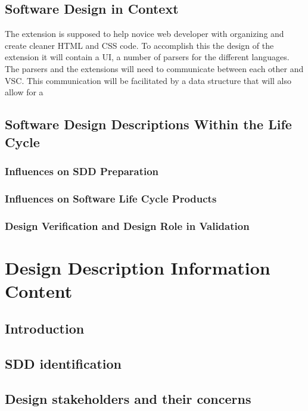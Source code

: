 \documentclass[letterpaper,10pt,titlepage,draftclsnofoot,onecolumn,onesided] {IEEEtran}
\begin{document}
\subsection{Software Design in Context}
The extension is supposed to help novice web developer with organizing and create cleaner HTML and CSS code. 
To accomplish this the design of the extension it will contain a UI, a number of parsers for the different languages.
The parsers and the extensions will need to communicate between each other and VSC.
This communication will be facilitated by a data structure that will also allow for a 



\subsection{Software Design Descriptions Within the Life Cycle}
\subsubsection{Influences on SDD Preparation}
\subsubsection{Influences on Software Life Cycle Products}
\subsubsection{Design Verification and Design Role in Validation}

\section{Design Description Information Content}

\subsection{Introduction}

\subsection{SDD identification}

\subsection{Design stakeholders and their concerns}

\end{document}
